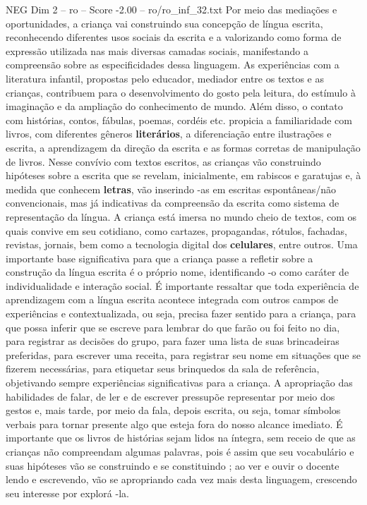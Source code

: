 \begin{textsample}{NEG Dim 2 – ro – Score -2.00 – ro/ro\_inf\_32.txt}
Por meio das mediações e oportunidades, a criança vai construindo sua concepção de língua escrita, reconhecendo diferentes usos sociais da escrita e a valorizando como forma de expressão utilizada nas mais diversas camadas sociais, manifestando a compreensão sobre as especificidades dessa linguagem.
As experiências com a literatura infantil, propostas pelo educador, mediador entre os textos e as crianças, contribuem para o desenvolvimento do gosto pela leitura, do estímulo à imaginação e da ampliação do conhecimento de mundo.
Além disso, o contato com histórias, contos, fábulas, poemas, cordéis etc. propicia a familiaridade com livros, com diferentes gêneros \textbf{literários}, a diferenciação entre ilustrações e escrita, a aprendizagem da direção da escrita e as formas corretas de manipulação de livros.
Nesse convívio com textos escritos, as crianças vão construindo hipóteses sobre a escrita que se revelam, inicialmente, em rabiscos e garatujas e, à medida que conhecem \textbf{letras}, vão inserindo -as em escritas espontâneas/não convencionais, mas já indicativas da compreensão da escrita como sistema de representação da língua.
A criança está imersa no mundo cheio de textos, com os quais convive em seu cotidiano, como cartazes, propagandas, rótulos, fachadas, revistas, jornais, bem como a tecnologia digital dos \textbf{celulares}, entre outros.
Uma importante base significativa para que a criança passe a refletir sobre a construção da língua escrita é o próprio nome, identificando -o como caráter de individualidade e interação social.
É importante ressaltar que toda experiência de aprendizagem com a língua escrita acontece integrada com outros campos de experiências e contextualizada, ou seja, precisa fazer sentido para a criança, para que possa inferir que se escreve para lembrar do que farão ou foi feito no dia, para registrar as decisões do grupo, para fazer uma lista de suas brincadeiras preferidas, para escrever uma receita, para registrar seu nome em situações que se fizerem necessárias, para etiquetar seus brinquedos da sala de referência, objetivando sempre experiências significativas para a criança.
A apropriação das habilidades de falar, de ler e de escrever pressupõe representar por meio dos gestos e, mais tarde, por meio da fala, depois escrita, ou seja, tomar símbolos verbais para tornar presente algo que esteja fora do nosso alcance imediato.
É importante que os livros de histórias sejam lidos na íntegra, sem receio de que as crianças não compreendam algumas palavras, pois é assim que seu vocabulário e suas hipóteses vão se construindo e se constituindo ; ao ver e ouvir o docente lendo e escrevendo, vão se apropriando cada vez mais desta linguagem, crescendo seu interesse por explorá -la.

\end{textsample}
